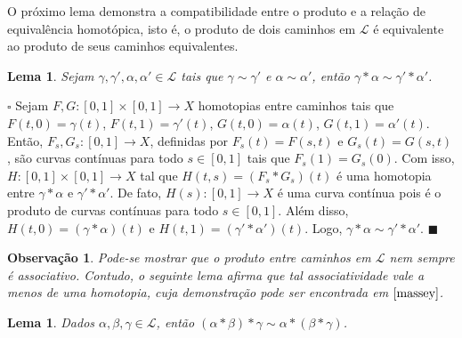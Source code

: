 \documentclass[12pt]{book}
\newtheorem{lema}[teorema]{Lema}
\newtheorem{observacao}[teorema]{Observação}
\newenvironment{prova}[1]{$\square$ #1}{\hfill$\blacksquare$}
\newcommand{\caminhos}{\mathcal{L}}
\newcommand{\intervalo}{[0,1]}
\begin{document}
	O próximo lema demonstra a compatibilidade entre o produto e a relação de equivalência homotópica, isto é, o produto de dois caminhos em $\caminhos$ é equivalente ao produto de seus caminhos equivalentes.
	
	\begin{lema}\label{lema_compatibilidade_produto_caminhos}
		Sejam $\gamma, \gamma', \alpha, \alpha' \in \caminhos$ tais que $\gamma \sim \gamma'$ e $\alpha \sim \alpha'$, então $\gamma * \alpha \sim \gamma' * \alpha'$.
	\end{lema}
	\begin{prova}
		Sejam  $F, G:[0,1] \times [0,1] \to X$ homotopias entre caminhos tais que $F(t,0)=\gamma(t)$, $F(t,1)=\gamma'(t)$, $G(t,0)=\alpha(t)$, $G(t,1)=\alpha'(t)$. Então, $F_{s}, G_{s}:\intervalo \to X$, definidas por $F_{s}(t) = F(s,t)$ e $G_{s}(t) = G(s,t)$, são curvas contínuas para todo $s \in \intervalo$ tais que $F_{s}(1) = G_{s}(0)$. Com isso, $H :\intervalo\times \intervalo\to X$ tal que $H(t, s)=(F_{s}*G_{s})(t)$ é uma homotopia entre $\gamma*\alpha$ e $\gamma'*\alpha'$. De fato, $H(s) :\intervalo\to X$ é uma curva contínua pois é o produto de curvas contínuas para todo $s \in \intervalo$. Além disso, $H(t, 0) = (\gamma*\alpha)(t)$ e $H(t, 1) = (\gamma'*\alpha')(t)$. Logo, $\gamma*\alpha \sim \gamma'*\alpha'$.
	\end{prova}
	
	\begin{observacao}
		Pode-se mostrar que o produto entre caminhos em $\caminhos$ nem sempre é associativo. Contudo, o seguinte lema afirma que tal associatividade vale a menos de uma homotopia, cuja demonstração pode ser encontrada em $\cite{massey}$.
	\end{observacao}
	
	\begin{lema}\label{lema_associatividade_produto_caminhos}
		Dados $\alpha, \beta, \gamma\in \caminhos$, então $(\alpha*\beta)*\gamma \sim \alpha*(\beta*\gamma)$.
	\end{lema}
	
\end{document}
